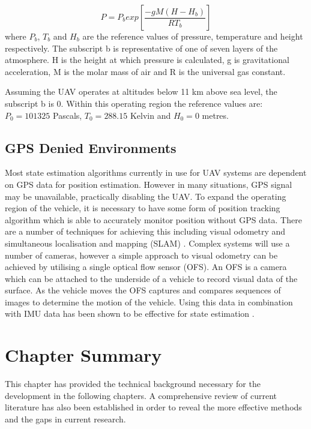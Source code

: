 \begin{equation}\label{eqn:baroFormula}
P=P_{b}exp\left[\frac{-g M (H-H_{b})}{R T_{b}}\right]
\end{equation}
where $P_{b}$, $T_{b}$ and $H_{b}$ are the reference values of pressure, temperature and height respectively. The subscript b is representative of one of seven layers of the atmosphere. H is the height at which pressure is calculated, g is gravitational acceleration, M is the molar mass of air and R is the universal gas constant. 

Assuming the UAV operates at altitudes below 11 km above sea level, the subscript b is 0. Within this operating region the reference values are: $P_{0}=101 325$ Pascals, $T_{0}=288.15$ Kelvin and $H_{0}=0$ metres.

\subsection{GPS Denied Environments}
Most state estimation algorithms currently in use for UAV systems are dependent on GPS data for position estimation. However in many situations, GPS signal may be unavailable, practically disabling the UAV. To expand the operating region of the vehicle, it is necessary to have some form of position tracking algorithm which is able to accurately monitor position without GPS data. There are a number of techniques for achieving this including visual odometry and simultaneous localisation and mapping (SLAM) \cite{Balamurugan2016}. Complex systems will use a number of cameras, however a simple approach to visual odometry can be achieved by utilising a single optical flow sensor (OFS). An OFS is a camera which can be attached to the underside of a vehicle to record visual data of the surface. As the vehicle moves the OFS captures and compares sequences of images to determine the motion of the vehicle. Using this data in combination with IMU data has been shown to be effective for state estimation \cite{Driessen2018}. 

\section{Chapter Summary}
This chapter has provided the technical background necessary for the development in the following chapters. A comprehensive review of current literature has also been established in order to reveal the more effective methods and the gaps in current research.



\clearpage


